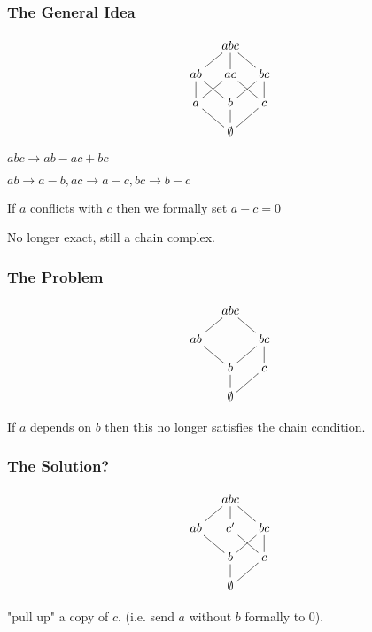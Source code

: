 \documentclass{beamer}
\begin{document}
\begin{frame}
\frametitle{The General Idea}

\begin{figure}
\begin{equation*}
    \xymatrix@=1em{& abc \ar@{-}[dl] \ar@{-}[d] \ar@{-}[dr] & \\
      ab \ar@{-}[d] \ar@{-}[dr] & ac \ar@{-}[dl] \ar@{-}[dr] &
        bc \ar@{-}[d] \ar@{-}[dl] \\
      a \ar@{-}[dr] & b \ar@{-}[d] & c \ar@{-}[dl] \\
       & \emptyset &}
\end{equation*}
\end{figure}

\(abc \to ab - ac + bc\)

\(ab \to a - b, ac \to a - c, bc \to b - c\)

If \(a\) conflicts with \(c\) then we formally set \(a - c = 0\)

No longer exact, still a chain complex.

\end{frame}


\begin{frame}
\frametitle{The Problem}

\begin{figure}
\begin{equation*}
    \xymatrix@=1em{& abc \ar@{-}[dl]  \ar@{-}[dr] & \\
      ab  \ar@{-}[dr] &   &
        bc \ar@{-}[d] \ar@{-}[dl] \\
       & b \ar@{-}[d] & c \ar@{-}[dl] \\
       & \emptyset &}
\end{equation*}
\end{figure}

If \(a\) depends on \(b\) then this no longer satisfies the chain condition.

\end{frame}

\begin{frame}
\frametitle{The Solution?}

\begin{figure}
\begin{equation*}
    \xymatrix@=1em{& abc \ar@{-}[dl] \ar@{-}[d] \ar@{-}[dr] & \\
      ab  \ar@{-}[dr] & c' \ar@{-}[dr]  &
        bc \ar@{-}[d] \ar@{-}[dl] \\
       & b \ar@{-}[d] & c \ar@{-}[dl] \\
       & \emptyset &}
\end{equation*}
\end{figure}

"pull up" a copy of \(c\). (i.e. send \(a\) without \(b\) formally to 0).

\end{frame}
\end{document}
